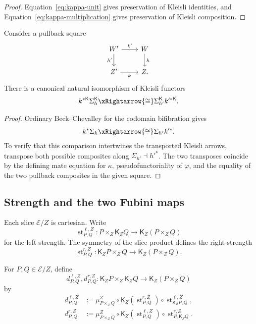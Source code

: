 \begin{proof}
Equation~\eqref{eq:kappa-unit} gives preservation of Kleisli identities, and
Equation~\eqref{eq:kappa-multiplication} gives preservation of Kleisli
composition.
\end{proof}

\begin{proposition}
\label{prop:effectful-beck-chevalley}
Consider a pullback square
\[
\begin{tikzcd}
    W'
        \arrow[r,"k'"]
        \arrow[d,"h'"']
    &
    W
        \arrow[d,"h"]
    \\
    Z'
        \arrow[r,"k"']
    &
    Z.
\end{tikzcd}
\]
There is a canonical natural isomorphism of Kleisli functors
\[
    k^{*\mathsf K}\Sigma_h^{\mathsf K}
    \xRightarrow{\cong}
    \Sigma_{h'}^{\mathsf K}k'^{*\mathsf K}.
\]
\end{proposition}

\begin{proof}
Ordinary Beck--Chevalley for the codomain bifibration gives
\[
    k^*\Sigma_h
    \xRightarrow{\cong}
    \Sigma_{h'}k'^*.
\]
To verify that this comparison intertwines the transported Kleisli arrows,
transpose both possible composites along
\(\Sigma_{h'}\dashv h'^*\).  The two transposes coincide by the defining mate
equation for \(\kappa\), pseudofunctoriality of \(\varphi\), and the equality
of the two pullback composites in the given square.
\end{proof}

\subsection{Strength and the two Fubini maps}
\label{subsec:slice-strength-fubini}

Each slice \(\mathcal E/Z\) is cartesian.  Write
\[
    \operatorname{st}^{\ell,Z}_{P,Q}:
    P\times_Z\mathsf K_ZQ
    \longrightarrow
    \mathsf K_Z(P\times_ZQ)
\]
for the left strength.  The symmetry of the slice product defines the right
strength
\[
    \operatorname{st}^{r,Z}_{P,Q}:
    \mathsf K_ZP\times_ZQ
    \longrightarrow
    \mathsf K_Z(P\times_ZQ).
\]

\begin{definition}
\label{def:slice-fubini-maps}
For \(P,Q\in\mathcal E/Z\), define
\[
    d^{\ell,Z}_{P,Q},
    d^{r,Z}_{P,Q}:
    \mathsf K_ZP\times_Z\mathsf K_ZQ
    \longrightarrow
    \mathsf K_Z(P\times_ZQ)
\]
by
\begin{align*}
    d^{\ell,Z}_{P,Q}
    &:=
    \mu^Z_{P\times_ZQ}
    \circ
    \mathsf K_Z(\operatorname{st}^{r,Z}_{P,Q})
    \circ
    \operatorname{st}^{\ell,Z}_{\mathsf K_ZP,Q},
    \\
    d^{r,Z}_{P,Q}
    &:=
    \mu^Z_{P\times_ZQ}
    \circ
    \mathsf K_Z(\operatorname{st}^{\ell,Z}_{P,Q})
    \circ
    \operatorname{st}^{r,Z}_{P,\mathsf K_ZQ}.
\end{align*}
\end{definition}


